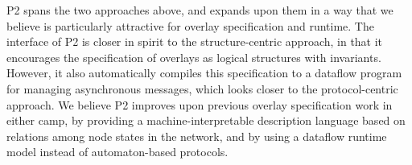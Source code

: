 \documentclass{sig-alt-full}
\def\Sys{P2\xspace}
\begin{document}
\Sys spans the two approaches above, and expands upon them in a way
that we believe is particularly attractive for overlay specification
and runtime.  The interface of \Sys is closer in spirit to the
structure-centric approach, in that it encourages the specification of
overlays as logical structures with invariants.  However, it also
automatically compiles this specification to a dataflow program for
managing asynchronous messages, which looks closer to the
protocol-centric approach.  We believe \Sys improves
upon previous overlay specification
work in either camp, by providing a machine-interpretable description
language based on relations among node states in the network, and by using a
dataflow runtime model instead of automaton-based protocols.

% 
% 
% 
\end{document}

